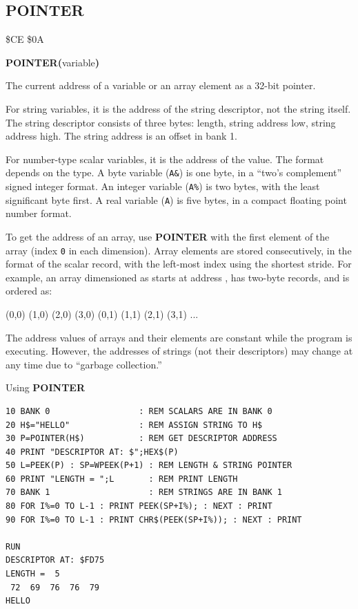 \subsection{POINTER}
\begin{description}[leftmargin=2cm,style=nextline]
\item [Token:]    \$CE \$0A

\item [Format:]   {\bf POINTER(}variable{\bf)}

\item [Returns:]  The current address of a variable or an array element as a 32-bit pointer.

                  For string variables, it is the address of the string descriptor, not the string itself. The string descriptor consists of three bytes: length, string address low, string address high. The string address is an offset in bank 1.

                  For number-type scalar variables, it is the address of the value. The format depends on the type. A byte variable ({\tt A\&}) is one byte, in a ``two's complement'' signed integer format. An integer variable ({\tt A\%}) is two bytes, with the least significant byte first. A real variable ({\tt A}) is five bytes, in a compact floating point number format.

                  To get the address of an array, use {\bf POINTER} with the first element of the array (index {\tt 0} in each dimension). Array elements are stored consecutively, in the format of the scalar record, with the left-most index using the shortest stride. For example, an array dimensioned as  starts at address , has two-byte records, and is ordered as:

                  (0,0)  (1,0)  (2,0)  (3,0)  (0,1)  (1,1)  (2,1)  (3,1) ...

\item [Remarks:]  The address values of arrays and their elements are constant while the program is executing. However, the addresses of strings (not their descriptors) may change at any time due to ``garbage collection.''

\item [Example:]  Using {\bf POINTER}

\begin{tcolorbox}[colback=black,coltext=white]
\verbatimfont{\codefont}
\begin{verbatim}
10 BANK 0                  : REM SCALARS ARE IN BANK 0
20 H$="HELLO"              : REM ASSIGN STRING TO H$
30 P=POINTER(H$)           : REM GET DESCRIPTOR ADDRESS
40 PRINT "DESCRIPTOR AT: $";HEX$(P)
50 L=PEEK(P) : SP=WPEEK(P+1) : REM LENGTH & STRING POINTER
60 PRINT "LENGTH = ";L       : REM PRINT LENGTH
70 BANK 1                    : REM STRINGS ARE IN BANK 1
80 FOR I%=0 TO L-1 : PRINT PEEK(SP+I%); : NEXT : PRINT
90 FOR I%=0 TO L-1 : PRINT CHR$(PEEK(SP+I%)); : NEXT : PRINT

RUN
DESCRIPTOR AT: $FD75
LENGTH =  5
 72  69  76  76  79
HELLO
\end{verbatim}
\end{tcolorbox}
\end{description}

